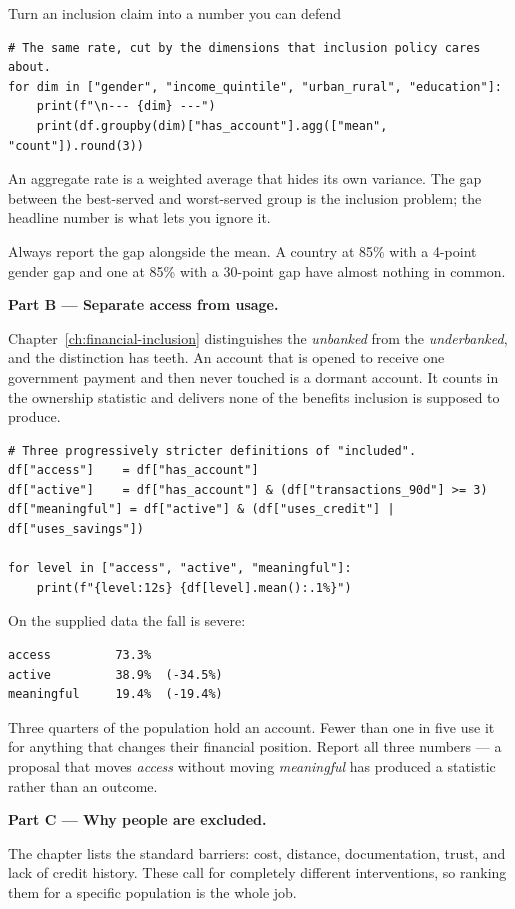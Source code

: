\begin{labproject}{Turn an inclusion claim into a number you can defend}
\begin{lstlisting}[style=utppython]
# The same rate, cut by the dimensions that inclusion policy cares about.
for dim in ["gender", "income_quintile", "urban_rural", "education"]:
    print(f"\n--- {dim} ---")
    print(df.groupby(dim)["has_account"].agg(["mean", "count"]).round(3))
\end{lstlisting}

\begin{keyidea}
An aggregate rate is a weighted average that hides its own variance. The gap between the best-served and worst-served group is the inclusion problem; the headline number is what lets you ignore it.

Always report the gap alongside the mean. A country at 85\% with a 4-point gender gap and one at 85\% with a 30-point gap have almost nothing in common.
\end{keyidea}

\medskip\noindent\textbf{Part B --- Separate access from usage.}\par
Chapter~\ref{ch:financial-inclusion} distinguishes the \emph{unbanked} from the \emph{underbanked}, and the distinction has teeth. An account that is opened to receive one government payment and then never touched is a dormant account. It counts in the ownership statistic and delivers none of the benefits inclusion is supposed to produce.

\begin{lstlisting}[style=utppython]
# Three progressively stricter definitions of "included".
df["access"]    = df["has_account"]
df["active"]    = df["has_account"] & (df["transactions_90d"] >= 3)
df["meaningful"] = df["active"] & (df["uses_credit"] | df["uses_savings"])

for level in ["access", "active", "meaningful"]:
    print(f"{level:12s} {df[level].mean():.1%}")
\end{lstlisting}

On the supplied data the fall is severe:

\begin{lstlisting}[style=utpterminal]
access         73.3%
active         38.9%  (-34.5%)
meaningful     19.4%  (-19.4%)
\end{lstlisting}

Three quarters of the population hold an account. Fewer than one in five use it for anything that changes their financial position. Report all three numbers --- a proposal that moves \emph{access} without moving \emph{meaningful} has produced a statistic rather than an outcome.

\medskip\noindent\textbf{Part C --- Why people are excluded.}\par
The chapter lists the standard barriers: cost, distance, documentation, trust, and lack of credit history. These call for completely different interventions, so ranking them for a specific population is the whole job.


\end{labproject}
